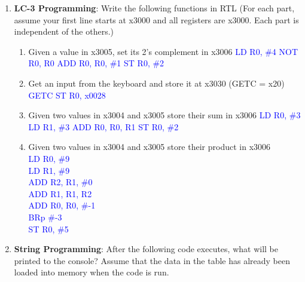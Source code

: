 \documentclass{article}
\begin{document}
\begin{enumerate}[label=(\alph*)]
\begin{enumerate}[label=(\alph*)]
\begin{enumerate}[label=(\roman*),itemsep = 10pt]
        \end{enumerate}
        \item \textbf{LC-3 Programming}: Write the following functions in RTL (For each part, assume your first line starts at x3000 and all registers are x3000. Each part is independent of the others.)
        \begin{enumerate}[label=(\roman*),itemsep = 10pt]
            \item Given a value in x3005, set its 2’s complement in x3006
            \newline \textcolor{blue}{LD R0, \#4}
            \newline \textcolor{blue}{NOT R0, R0}
            \newline \textcolor{blue}{ADD R0, R0, \#1}
            \newline \textcolor{blue}{ST R0, \#2}
            \item Get an input from the keyboard and store it at x3030 (GETC = x20)
            \newline \textcolor{blue}{GETC}
            \newline \textcolor{blue}{ST R0, x0028}
            \item Given two values in x3004 and x3005 store their sum in x3006
            \newline \textcolor{blue}{LD R0, \#3}
            \newline \textcolor{blue}{LD R1, \#3}
            \newline \textcolor{blue}{ADD R0, R0, R1}
            \newline \textcolor{blue}{ST R0, \#2}
            \item Given two values in x3004 and x3005 store their product in x3006
            \\ \textcolor{blue}{LD R0, \#9}
            \\ \textcolor{blue}{LD R1, \#9}
            \\ \textcolor{blue}{ADD R2, R1, \#0}
            \\ \textcolor{blue}{ADD R1, R1, R2}
            \\ \textcolor{blue}{ADD R0, R0, \#-1}
            \\ \textcolor{blue}{BRp \#-3}
            \\ \textcolor{blue}{ST R0, \#5}
        \end{enumerate}
        \item \textbf{String Programming}: After the following code executes, what will be printed to the console? Assume that the data in the table has already been loaded into memory when the code is run.

\end{enumerate}
\end{enumerate}
\end{document}
